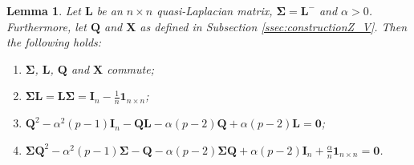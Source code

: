 \documentclass[12pt]{article}
\theoremstyle{plain}
\newtheorem{lemma}[theorem]{Lemma}
\theoremstyle{remark}
\newcommand{\onenn}[0]{{\mathbf{1}_{n\times n}}}
\newcommand{\latMatr}[1]{\mathbf{#1}}          %
\newcommand{\grMatr}[1]{{\boldsymbol{#1}}}   %
\newcommand{\matr}[1]{\mathbf{#1}}          %
\newcommand{\tobi}[1]{\textcolor{teal}{#1}}
\begin{document}
    \begin{lemma}
        \label{lem:usefulIdentities}
        Let $\latMatr L$ be an $n \times n$ quasi-Laplacian matrix,  
        ${\grMatr{\Sigma}}={\latMatr{L}}^-$ and $\alpha >0$. Furthermore, let $\latMatr Q$ and $\latMatr X$ as defined in Subsection \ref{ssec:constructionZ_V}. Then the following holds:
        \begin{enumerate}
            \item \label{item:lemUsefulId_Commute}${\grMatr{\Sigma}}$, $\latMatr L$, $\latMatr Q$ and $\latMatr X$ commute;
            \item \label{item:lemUsefulId_LSigma}${\grMatr{\Sigma}} {\latMatr{L}}= {\latMatr{L}}{\grMatr{\Sigma}} = \latMatr{I}_n-\frac{1}{n} \onenn$;
            \item \label{item:lemUsefulId_Q2} $\latMatr Q^2-\alpha^2 (p-1) \latMatr{I}_n - \latMatr Q {\latMatr{L}}- \alpha (p-2) \latMatr Q + \alpha (p-2) {\latMatr{L}}= \matr 0$;
            \item \label{item:lemUsefulId_SigmaQ2} ${\grMatr{\Sigma}} \latMatr Q^2 - \alpha^2 (p-1) {\grMatr{\Sigma}} - \latMatr Q - \alpha (p-2) {\grMatr{\Sigma}} \latMatr Q + \alpha (p-2) \latMatr{I}_n + \frac{\alpha}{n} \onenn=\matr 0$.
        \end{enumerate}
    \end{lemma}
\end{document}
